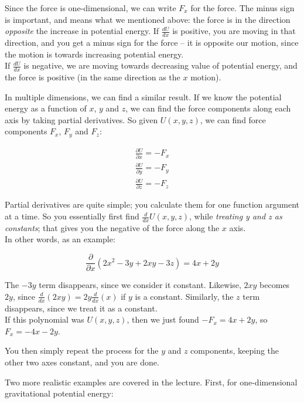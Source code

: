Since the force is one-dimensional, we can write $F_x$ for the force. The minus sign is important, and means what we mentioned above: the force is in the direction \emph{opposite} the increase in potential energy. If $\frac{dU}{dx}$ is positive, you are moving in that direction, and you get a minus sign for the force -- it is opposite our motion, since the motion is towards increasing potential energy.\\
If $\frac{dU}{dx}$ is negative, we are moving towards decreasing value of potential energy, and the force is positive (in the same direction as the $x$ motion).

In multiple dimensions, we can find a similar result. If we know the potential energy as a function of $x$, $y$ and $z$, we can find the force components along each axis by taking partial derivatives. So given $U(x, y, z)$, we can find force components $F_x$, $F_y$ and $F_z$:

\begin{align}
\frac{\partial U}{\partial x} = - F_x\\
\frac{\partial U}{\partial y} = - F_y\\
\frac{\partial U}{\partial z} = - F_z
\end{align}

Partial derivatives are quite simple; you calculate them for one function argument at a time. So you essentially first find $\displaystyle \frac{d}{dx} U(x,y,z)$, while \emph{treating y and z as constants}; that gives you the negative of the force along the $x$ axis.\\
In other words, as an example:

\begin{equation}
\frac{\partial}{\partial x}\left(2x^2 - 3y + 2 x y - 3z\right) = 4x + 2y
\end{equation}

The $-3 y$ term disappears, since we consider it constant. Likewise, $2 x y$ becomes $2 y$, since $\displaystyle \frac{d}{dx}(2 x y) = 2 y \frac{d}{dx} (x)$ if $y$ is a constant. Similarly, the $z$ term disappears, since we treat it as a constant.\\
If this polynomial was $U(x, y, z)$, then we just found $-F_x = 4x + 2 y$, so $F_x = -4 x - 2 y$.

You then simply repeat the process for the $y$ and $z$ components, keeping the other two axes constant, and you are done.

Two more realistic examples are covered in the lecture. First, for one-dimensional gravitational potential energy:

